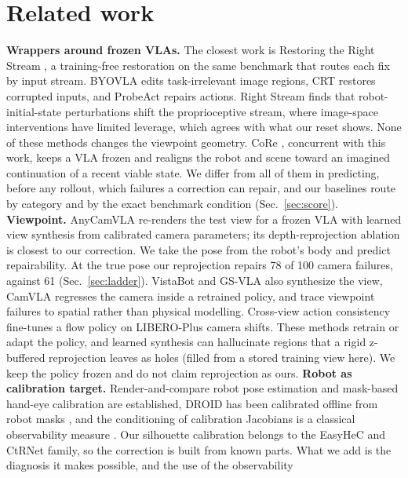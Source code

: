 \documentclass{article}
\begin{document}
\section{Related work}
\label{sec:related}
\textbf{Wrappers around frozen VLAs.} The closest work is Restoring the Right Stream \citep{rightstream}, a training-free
restoration on the same benchmark that routes each fix by input stream. BYOVLA \citep{byovla} edits task-irrelevant
image regions, CRT \citep{crt} restores corrupted inputs, and ProbeAct \citep{probeact} repairs actions. Right Stream
finds that robot-initial-state perturbations shift the proprioceptive stream, where image-space interventions have
limited leverage, which agrees with what our reset shows. None of these methods changes the viewpoint
geometry. CoRe \citep{core}, concurrent with this work, keeps a VLA frozen and realigns the robot and scene toward an
imagined continuation of a recent viable state. We differ from all of them in predicting, before any rollout, which
failures a correction can repair, and our baselines route by category and by the exact benchmark condition
(Sec.~\ref{sec:score}).
\textbf{Viewpoint.} AnyCamVLA \citep{anycamvla} re-renders the test view for a frozen VLA with learned view
synthesis from calibrated camera parameters; its depth-reprojection ablation is closest to our correction. We take
the pose from the robot's body and predict repairability. At the true pose our reprojection repairs 78 of 100 camera
failures, against 61 (Sec.~\ref{sec:ladder}). VistaBot \citep{vistabot} and GS-VLA \citep{gsvla} also synthesize the view, CamVLA \citep{fixedtofree} regresses the camera inside a retrained policy,
and \citet{spatialvla} trace viewpoint failures to spatial rather than physical modelling. Cross-view action consistency
\citep{crossview} fine-tunes a flow policy on LIBERO-Plus camera shifts. These methods retrain or adapt the policy, and
learned synthesis can hallucinate regions that a rigid z-buffered reprojection leaves as holes (filled from a stored
training view here). We keep the policy frozen and do not claim reprojection as ours.
\textbf{Robot as calibration target.} Render-and-compare robot pose estimation \citep{dream,robopose,ctrnet,gisr} and
mask-based hand-eye calibration \citep{easyhec,easyhecpp} are established, DROID \citep{droid} has been calibrated
offline from robot masks \citep{caliball,poseddroid}, and the conditioning of calibration Jacobians is a classical
observability measure \citep{bornmenq,nahvi}. Our silhouette calibration belongs to the EasyHeC and CtRNet family, so the
correction is built from known parts. What we add is the diagnosis it makes possible, and the use of the observability
\end{document}
